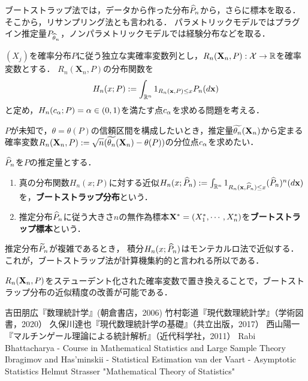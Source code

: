\documentclass[uplatex,dvipdfmx]{jsreport}
\begin{document}
\begin{tcolorbox}[colframe=ForestGreen, colback=ForestGreen!10!white,breakable,colbacktitle=ForestGreen!40!white,coltitle=black,fonttitle=\bfseries\sffamily,
title=]
    ブートストラップ法では，データから作った分布$\widehat{P}_n$から，さらに標本を取る．そこから，リサンプリング法とも言われる．
    パラメトリックモデルではプラグイン推定量$P_{\widehat{\theta}_n}$，ノンパラメトリックモデルでは経験分布などを取る．
\end{tcolorbox}

\begin{notation}
    $(X_j)$を確率分布$P$に従う独立な実確率変数列とし，$R_n(\mathbf{X}_n,P):\mathcal{X}\to\mathbb{R}$を確率変数とする．
    $R_n(\mathbf{X}_n,P)$の分布関数を
    \[H_n(x;P):=\int_{\mathbb{R}^n}1_{R_n(\mathbf{x},P)\le x}P_n(d\mathbf{x})\]
    と定め，$H_n(c_\alpha;P)=\alpha\in(0,1)$を満たす点$c_\alpha$を求める問題を考える．
\end{notation}
\begin{example}
    $P$が未知で，$\theta=\theta(P)$の信頼区間を構成したいとき，推定量$\widetilde{\theta_n}(\mathbf{X}_n)$から定まる確率変数$R_n(\mathbf{X}_n,P):=\sqrt{n}(\widetilde{\theta_n}(\mathbf{X}_n)-\theta(P))$の分位点$c_\alpha$を求めたい．
\end{example}

\begin{definition}
    $\widehat{P}_n$を$P$の推定量とする．
    \begin{enumerate}
        \item 真の分布関数$H_n(x;P)$に対する近似$H_n(x;\widehat{P}_n):=\int_{\mathbb{R}^n}1_{R_n(\mathbf{x},\widehat{P}_n)\le x}(\widehat{P}_n)^n(d\mathbf{x})$を，\textbf{ブートストラップ分布}という．
        \item 推定分布$\widehat{P}_n$に従う大きさ$n$の無作為標本$\mathbf{X}^*=(X^*_1,\cdots,X^*_n)$を\textbf{ブートストラップ標本}という．
    \end{enumerate}
\end{definition}
\begin{remark}
    推定分布$\widetilde{P}_n$が複雑であるとき，
    積分$H_n(x;\widehat{P}_n)$はモンテカルロ法で近似する．
    これが，ブートストラップ法が計算機集約的と言われる所以である．
\end{remark}
\begin{remark}[studentization]
    $R_n(\mathbf{X}_n,P)$をステューデント化された確率変数で置き換えることで，ブートストラップ分布の近似精度の改善が可能である．
\end{remark}

\begin{thebibliography}{99}
    吉田朋広『数理統計学』(朝倉書店，2006)
    竹村彰道『現代数理統計学』（学術図書，2020）
    久保川達也『現代数理統計学の基礎』（共立出版，2017）
    西山陽一『マルチンゲール理論による統計解析』（近代科学社，2011）
    Rabi Bhattacharya - Course in Mathematical Statistics and Large Sample Theory
    Ibragimov and Has'minskii - Statistical Estimation
    van der Vaart - Asymptotic Statistics
    Helmut Strasser "Mathematical Theory of Statistics"
\end{thebibliography}
\end{document}

